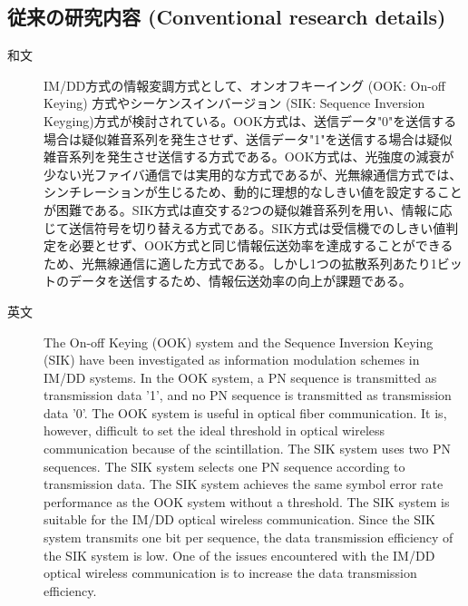 ﻿\documentclass[a4j,10pt]{jarticle}
\begin{document}
\subsection{従来の研究内容 (Conventional research details)}
\begin{description}
 \item[和文] IM/DD方式の情報変調方式として、オンオフキーイング (OOK: On-off Keying) 方式\cite{ook}\cite{scinti}やシーケンスインバージョン (SIK: Sequence Inversion Keyging)方式\cite{sik1}\cite{sik2}が検討されている。OOK方式は、送信データ"0"を送信する場合は疑似雑音系列を発生させず、送信データ"1"を送信する場合は疑似雑音系列を発生させ送信する方式である。OOK方式は、光強度の減衰が少ない光ファイバ通信では実用的な方式であるが、光無線通信方式では、シンチレーションが生じるため\cite{scinti}、動的に理想的なしきい値を設定することが困難である。SIK方式は直交する2つの疑似雑音系列を用い、情報に応じて送信符号を切り替える方式である。SIK方式は受信機でのしきい値判定を必要とせず、OOK方式と同じ情報伝送効率を達成することができるため、光無線通信に適した方式である。しかし1つの拡散系列あたり1ビットのデータを送信するため、情報伝送効率の向上が課題である。
%
 \item[英文] The On-off Keying (OOK) system \cite{ook}\cite{scinti} and the Sequence Inversion Keying (SIK) \cite{sik1}\cite{sik2} have been investigated as information modulation schemes in IM/DD systems. In the OOK system, a PN sequence is transmitted as transmission data '1', and no PN sequence is transmitted as transmission data '0'. The OOK system is useful in optical fiber communication. It is, however, difficult to set the ideal threshold in optical wireless communication because of the scintillation. The SIK system uses two PN sequences. The SIK system selects one PN sequence according to transmission data. The SIK system achieves the same symbol error rate performance as the OOK system without a threshold. The SIK system is suitable for the IM/DD optical wireless communication. Since the SIK system transmits one bit per sequence, the data transmission efficiency of the SIK system is low. One of the issues encountered with the IM/DD optical wireless communication is to increase the data transmission efficiency. 
\end{description}
%
\end{document}
